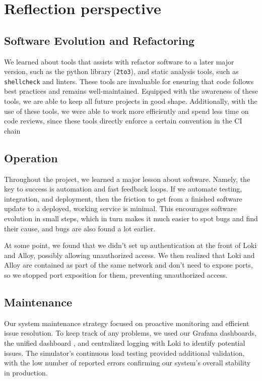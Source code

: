 \section{Reflection perspective} \label{rp}
\subsection{Software Evolution and Refactoring}
We learned about tools that assists with refactor software to a later major version, such as the python library (\texttt{2to3}), and static analysis tools, such as \texttt{shellcheck} and linters. These tools are invaluable for ensuring that code follows best practices and remains well-maintained. Equipped with the awareness of these tools, we are able to keep all future projects in good shape. Additionally, with the use of these tools, we were able to work more efficiently and spend less time on code reviews, since these tools directly enforce a certain convention in the CI chain


\subsection{Operation} %
Throughout the project, we learned a major lesson about software. Namely, the key to success is automation and fast feedback loops. If we automate testing, integration, and deployment, then the friction to get from a finished software update to a deployed, working service is minimal. This encourages software evolution in small steps, which in turn makes it much easier to spot bugs and find their cause, and bugs are also found a lot earlier.

At some point, we found that we didn’t set up authentication at the front of Loki
and Alloy, possibly allowing unauthorized access. We then realized 
that Loki and Alloy are contained as part of the same network and don’t need to expose ports,
so we stopped port exposition for them, preventing unauthorized access.

\subsection{Maintenance} 
Our system maintenance strategy focused on proactive monitoring and efficient issue resolution. To keep track of any problems, we used our Grafana dashboards, the unified dashboard \parencite["Status for All Groups"]{dashboard}, and centralized logging with Loki to identify potential issues. The simulator's continuous load testing provided additional validation, with the low number of reported errors confirming our system's overall stability in production.

